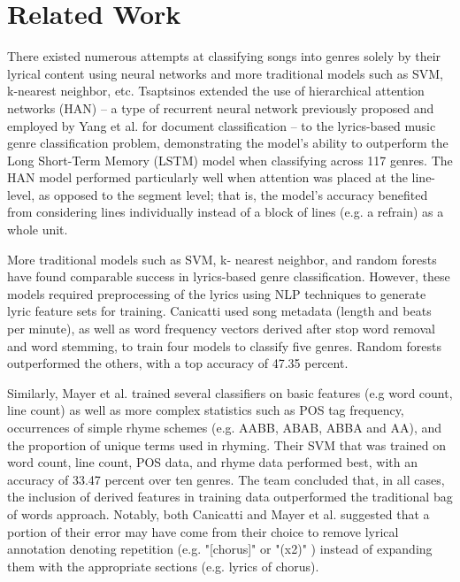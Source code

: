 \documentclass[journal]{IEEEtran}
\begin{document}

\section{Related Work}

There existed numerous attempts at classifying songs into genres solely by their lyrical content using neural networks and more traditional models such as SVM, k-nearest neighbor, etc.
Tsaptsinos \cite{tsaptsinos} extended the use of hierarchical attention networks (HAN) -- a type of recurrent neural network previously proposed and employed by Yang et al. \cite{Yang} for document classification -- to the lyrics-based music genre classification problem, demonstrating the model's ability to outperform the Long Short-Term Memory (LSTM) model when classifying across 117 genres. The HAN model performed particularly well when attention was placed at the line-level, as opposed to the segment level; that is, the model's accuracy benefited from considering lines individually instead of a block of lines (e.g. a refrain) as a whole unit. \par

More traditional models such as SVM, k- nearest neighbor, and random forests have found comparable success in lyrics-based genre classification. However, these models required preprocessing of the lyrics using NLP techniques to generate lyric feature sets for training. Canicatti \cite{canicatti} used song metadata (length and beats per minute), as well as word frequency vectors derived after stop word removal and word stemming, to train four models to classify five genres. Random forests outperformed the others, with a top accuracy of 47.35 percent. \par

Similarly, Mayer et al. \cite{mayer} trained several classifiers on basic features (e.g word count, line count) as well as more complex statistics such as POS tag frequency, occurrences of simple rhyme schemes (e.g. AABB, ABAB, ABBA and AA), and the proportion of unique terms used in rhyming. Their SVM that was trained on word count, line count, POS data, and rhyme data performed best, with an accuracy of 33.47 percent over ten genres. The team concluded that, in all cases, the inclusion of derived features in training data outperformed the traditional bag of words approach. Notably, both Canicatti and Mayer et al. suggested that a portion of their error may have come from their choice to remove lyrical annotation denoting repetition (e.g. "[chorus]" or "(x2)" ) instead of expanding them with the appropriate sections (e.g. lyrics of chorus). \par
\end{document}
